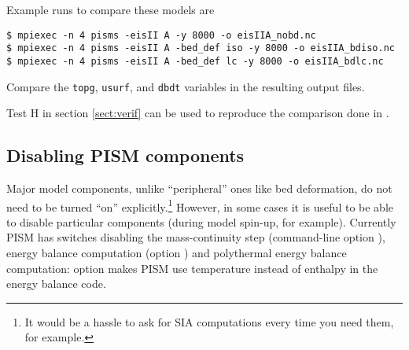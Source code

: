 Example runs to compare these models are
\begin{verbatim}
$ mpiexec -n 4 pisms -eisII A -y 8000 -o eisIIA_nobd.nc
$ mpiexec -n 4 pisms -eisII A -bed_def iso -y 8000 -o eisIIA_bdiso.nc
$ mpiexec -n 4 pisms -eisII A -bed_def lc -y 8000 -o eisIIA_bdlc.nc
\end{verbatim}
Compare the \texttt{topg}, \texttt{usurf}, and \texttt{dbdt} variables in the resulting output files.

Test H in section \ref{sect:verif} can be used to reproduce the comparison done in \cite{BLKfastearth}.

\subsection{Disabling PISM components}
\label{sec:turning-off}

Major model components, unlike ``peripheral'' ones like bed deformation, do not need to be turned ``on'' explicitly.\footnote{It would be a hassle to ask for SIA computations every time you need them, for example.} However, in some cases it is useful to be able to disable particular components (during model spin-up, for example). Currently PISM has switches disabling the mass-continuity step (command-line option ), energy balance computation (option ) and polythermal energy balance computation: option  makes PISM use temperature instead of enthalpy in the energy balance code.



